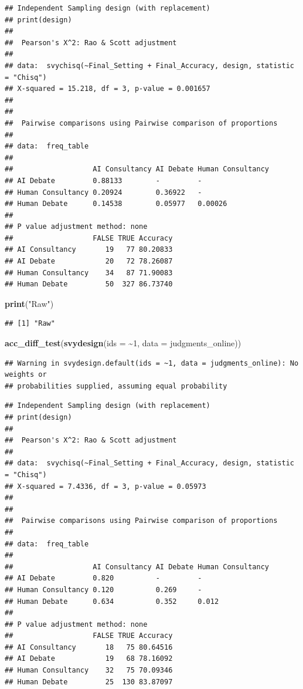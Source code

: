 \documentclass[
]{article}
\newenvironment{Shaded}{\begin{snugshade}}{\end{snugshade}}
\newcommand{\AttributeTok}[1]{\textcolor[rgb]{0.13,0.29,0.53}{#1}}
\newcommand{\DecValTok}[1]{\textcolor[rgb]{0.00,0.00,0.81}{#1}}
\newcommand{\FunctionTok}[1]{\textcolor[rgb]{0.13,0.29,0.53}{\textbf{#1}}}
\newcommand{\NormalTok}[1]{#1}
\newcommand{\SpecialCharTok}[1]{\textcolor[rgb]{0.81,0.36,0.00}{\textbf{#1}}}
\newcommand{\StringTok}[1]{\textcolor[rgb]{0.31,0.60,0.02}{#1}}
\begin{document}
\begin{verbatim}
## Independent Sampling design (with replacement)
## print(design)
## 
##  Pearson's X^2: Rao & Scott adjustment
## 
## data:  svychisq(~Final_Setting + Final_Accuracy, design, statistic = "Chisq")
## X-squared = 15.218, df = 3, p-value = 0.001657
## 
## 
##  Pairwise comparisons using Pairwise comparison of proportions 
## 
## data:  freq_table 
## 
##                   AI Consultancy AI Debate Human Consultancy
## AI Debate         0.88133        -         -                
## Human Consultancy 0.20924        0.36922   -                
## Human Debate      0.14538        0.05977   0.00026          
## 
## P value adjustment method: none 
##                   FALSE TRUE Accuracy
## AI Consultancy       19   77 80.20833
## AI Debate            20   72 78.26087
## Human Consultancy    34   87 71.90083
## Human Debate         50  327 86.73740
\end{verbatim}

\begin{Shaded}
\begin{Highlighting}[]
\FunctionTok{print}\NormalTok{(}\StringTok{"Raw"}\NormalTok{)}
\end{Highlighting}
\end{Shaded}

\begin{verbatim}
## [1] "Raw"
\end{verbatim}

\begin{Shaded}
\begin{Highlighting}[]
\FunctionTok{acc\_diff\_test}\NormalTok{(}\FunctionTok{svydesign}\NormalTok{(}\AttributeTok{ids =} \SpecialCharTok{\textasciitilde{}}\DecValTok{1}\NormalTok{, }\AttributeTok{data =}\NormalTok{ judgments\_online))}
\end{Highlighting}
\end{Shaded}

\begin{verbatim}
## Warning in svydesign.default(ids = ~1, data = judgments_online): No weights or
## probabilities supplied, assuming equal probability
\end{verbatim}

\begin{verbatim}
## Independent Sampling design (with replacement)
## print(design)
## 
##  Pearson's X^2: Rao & Scott adjustment
## 
## data:  svychisq(~Final_Setting + Final_Accuracy, design, statistic = "Chisq")
## X-squared = 7.4336, df = 3, p-value = 0.05973
## 
## 
##  Pairwise comparisons using Pairwise comparison of proportions 
## 
## data:  freq_table 
## 
##                   AI Consultancy AI Debate Human Consultancy
## AI Debate         0.820          -         -                
## Human Consultancy 0.120          0.269     -                
## Human Debate      0.634          0.352     0.012            
## 
## P value adjustment method: none 
##                   FALSE TRUE Accuracy
## AI Consultancy       18   75 80.64516
## AI Debate            19   68 78.16092
## Human Consultancy    32   75 70.09346
## Human Debate         25  130 83.87097
\end{verbatim}
\end{document}
